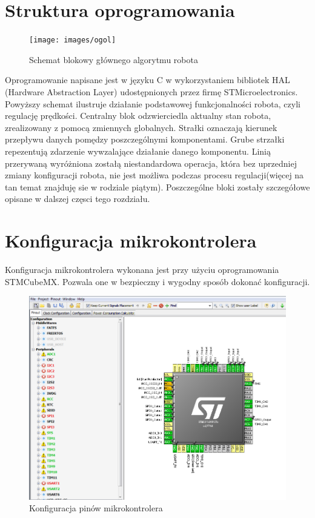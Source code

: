 \documentclass[eng,printmode]{mgr}
\begin{document}
 \section{Struktura oprogramowania}
   \begin{figure}[ht]
    \centering
    \texttt{[image: images/ogol]}
    \caption{Schemat blokowy głównego algorytmu robota}
    \label{fig:ogol}
   \end{figure}

Oprogramowanie napisane jest w języku C w wykorzystaniem bibliotek HAL (Hardware Abstraction Layer) udostępnionych przez firmę STMicroelectronics. Powyższy schemat ilustruje działanie podstawowej funkcjonalności robota, czyli regulację prędkości. 
Centralny blok odzwierciedla aktualny stan robota, zrealizowany z pomocą zmiennych globalnych. Strałki oznaczają kierunek przepływu danych pomędzy poszczególnymi komponentami. Grube strzałki repezentują zdarzenie wywzalające działanie danego komponentu. Linią przerywaną wyróżniona zostałą niestandardowa operacja, która bez uprzedniej zmiany konfiguracji robota, nie jest możliwa podczas procesu regulacji(więcej na tan temat znajduję sie w rodziale piątym). Poszczególne bloki zostały szczegółowe opisane w dalszej częsci tego rozdziału.
 \section{Konfiguracja mikrokontrolera}

Konfiguracja mikrokontrolera wykonana jest przy użyciu oprogramowania STMCubeMX. Pozwala one w bezpieczny i wygodny sposób dokonać konfiguracji.

   \begin{figure}[ht]
    \centering
    \includegraphics[width=1\textwidth]{images/cubemx1}
    \caption{Konfiguracja pinów mikrokontrolera}
    \label{fig:cubemx1}
   \end{figure}
\end{document}
